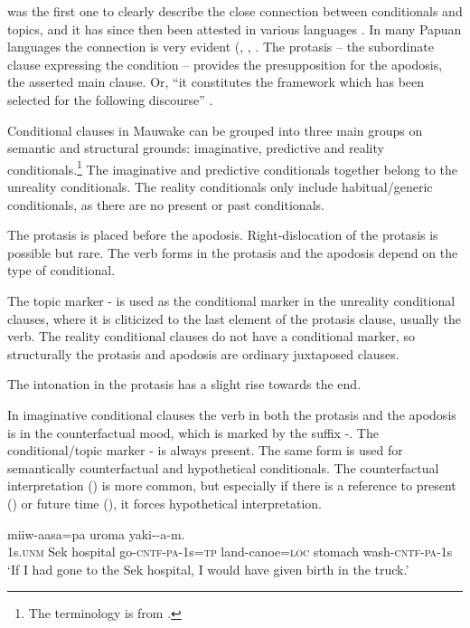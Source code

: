 \citet{Haiman1978} was the first one to clearly describe the close connection between conditionals and topics, and it has since then been attested in various languages \citep[292]{ThompsonEtAl2007}. In many Papuan languages the connection is very evident (\citealt[235--244]{Reesink1987}, \citealt[304--308]{MacDonald1990}, \citealt[263]{Farr1999}. The protasis -- the subordinate clause expressing the condition -- provides the presupposition for the apodosis, the asserted main clause. Or, ``it constitutes the framework which has been selected for the following discourse'' \citep[585]{Haiman1978}.

Conditional clauses in Mauwake can be grouped into three main groups on semantic and structural grounds: imaginative, predictive and reality conditionals.\footnote{The terminology is from \citet[255]{ThompsonEtAl2007}.} The imaginative and predictive conditionals together belong to the unreality conditionals. The reality conditionals only include habitual/generic conditionals, as there are no present or past conditionals.

The protasis is placed before the apodosis. Right-dislocation of the protasis is possible but rare. The verb forms in the protasis and the apodosis depend on the type of conditional.

The topic marker - is used as the conditional marker in the unreality conditional clauses, where it is cliticized to the last element of the protasis clause, usually the verb. The reality conditional clauses do not have a conditional marker, so structurally the protasis and apodosis are ordinary juxtaposed clauses. 

The intonation in the protasis has a slight rise towards the end.  

In imaginative conditional clauses the verb in both the protasis and the apodosis is in the counterfactual mood, which is marked by the suffix -. The conditional/topic marker - is always present. The same form is used for semantically counterfactual and hypothetical conditionals. The counterfactual interpretation () is more common, but especially if there is a reference to present () or future time (), it forces hypothetical interpretation.

\ea%
\label{ex:x1645}
\gll [Yo  Sek  haussik  ikiw-\textstyleEmphasizedVernacularWords{ek}-a-m=\textstyleEmphasizedVernacularWords{na}]  miiw-aasa=pa uroma  yaki--a-m.\\
1s.\textsc{unm}  Sek  hospital  go-\textsc{cntf}-\textsc{pa}-1s=\textsc{tp} land-canoe=\textsc{loc} stomach  wash-\textsc{cntf}-\textsc{pa}-1s\\
\glt`If I had gone to the Sek hospital, I would have given birth in the truck.'
\z


